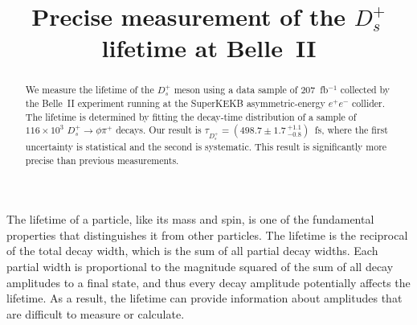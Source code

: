 \documentclass[aps,prl,twocolumn,superscriptaddress,showpacs,preprintnumbers,amsmath,amssymb]{revtex4-2}
\def\ra{\!\rightarrow\!}
\begin{document}
\vspace*{-3\baselineskip}

\vspace*{\baselineskip}
\begin{flushright}
\end{flushright}


\title{
{\boldmath Precise measurement of the $D^+_s$ lifetime at Belle~II }
}



\begin{abstract}
We measure the lifetime of the $D_s^+$ meson using a data sample of 
207~fb$^{-1}$ collected by the Belle~II experiment running at the
SuperKEKB asymmetric-energy $e^+ e^-$ collider. 
The lifetime is determined by fitting the decay-time distribution of
a sample of $116\times 10^3$ $D_s^+\ra\phi\pi^+$ decays.
Our result is $\tau^{}_{D^+_s} = (498.7\pm 1.7\,^{+1.1}_{-0.8})$~fs, 
where the first uncertainty is statistical and the second is systematic.
This result is significantly more precise than previous measurements.
\end{abstract}

\maketitle

The lifetime of a particle, like its mass and spin, is one of the fundamental
properties that distinguishes it from other particles. The lifetime is the 
reciprocal of the total decay width, which is the sum of all partial decay 
widths. Each partial width is proportional to the magnitude squared of 
the sum of all decay amplitudes to a final state, and thus every decay 
amplitude potentially affects the lifetime. As a result, the lifetime
can provide information about amplitudes that are difficult to measure or calculate. 
\end{document}
